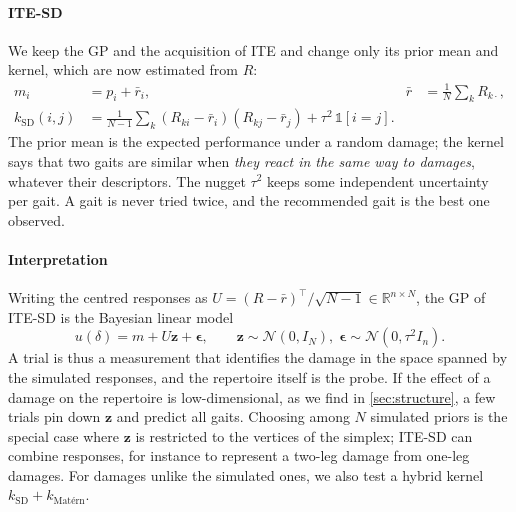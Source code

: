 \paragraph{ITE-SD} We keep the GP and the acquisition of ITE and change only its prior mean and kernel, which are now
estimated from $R$:
\begin{align}
  m_i &= p_i + \bar r_i, & \bar r &= \tfrac{1}{N}\textstyle\sum_k R_{k\cdot},\\
  k_{\text{SD}}(i,j) &= \tfrac{1}{N-1}\textstyle\sum_k (R_{ki}-\bar r_i)(R_{kj}-\bar r_j) + \tau^2\,\mathbb{1}[i=j].
\end{align}
The prior mean is the expected performance under a random damage; the kernel says that two gaits are similar when
\emph{they react in the same way to damages}, whatever their descriptors. The nugget $\tau^2$ keeps some independent
uncertainty per gait. A gait is never tried twice, and the recommended gait is the best one observed.

\paragraph{Interpretation} Writing the centred responses as $U = (R-\bar r)^\top/\sqrt{N-1}\in\mathbb{R}^{n\times N}$,
the GP of ITE-SD is the Bayesian linear model
\[
  u(\delta) = m + U\mathbf{z} + \boldsymbol{\epsilon}, \qquad \mathbf{z}\sim\mathcal{N}(0,I_N),\;
  \boldsymbol{\epsilon}\sim\mathcal{N}(0,\tau^2 I_n).
\]
A trial is thus a measurement that identifies the damage in the space spanned by the simulated responses, and the
repertoire itself is the probe. If the effect of a damage on the repertoire is low-dimensional, as we find in
\cref{sec:structure}, a few trials pin down $\mathbf{z}$ and predict all gaits. Choosing among $N$ simulated priors
\cite{kaushik2020adaptive} is the special case where $\mathbf{z}$ is restricted to the vertices of the simplex;
ITE-SD can combine responses, for instance to represent a two-leg damage from one-leg damages. For damages unlike the
simulated ones, we also test a hybrid kernel $k_{\text{SD}}+k_{\text{Mat\'ern}}$.
